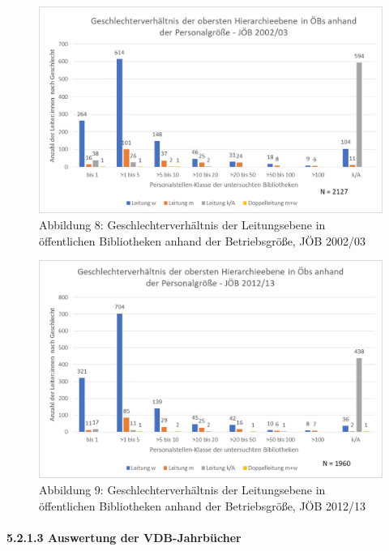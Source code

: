 \documentclass[a4paper,
fontsize=11pt,
oneside,
numbers=noperiodatend,
parskip=half-,
bibliography=totoc,
final
]{scrartcl}
\begin{document}
\begin{figure}
\centering
\includegraphics{img/Abb_08_JOB-2002.jpg}
\caption{Abbildung 8: Geschlechterverhältnis der Leitungsebene in
öffentlichen Bibliotheken anhand der Betriebsgröße, JÖB 2002/03}
\end{figure}

\begin{figure}
\centering
\includegraphics{img/Abb_09_JOB-2012.jpg}
\caption{Abbildung 9: Geschlechterverhältnis der Leitungsebene in
öffentlichen Bibliotheken anhand der Betriebsgröße, JÖB 2012/13}
\end{figure}

\paragraph{5.2.1.3 Auswertung der VDB-Jahrbücher}
\end{document}
